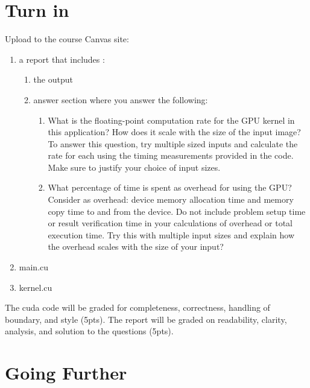 \documentclass{article}
\begin{document}
\section{Turn in}
Upload to the course Canvas site:
\begin{enumerate}
\item a report that includes :
	\begin{enumerate}
	\item the output 
	\item answer section where you answer the following:
		\begin{enumerate}
		\item What is the floating-point computation rate for the GPU kernel in this application? How does it scale with the size of the input image? To answer this question, try multiple sized inputs and calculate the rate for each using the timing measurements provided in the code. Make sure to justify your choice of input sizes.
		\item	What percentage of time is spent as overhead for using the GPU? Consider as overhead: device memory allocation time and memory copy time to and from the device. Do not include problem setup time or result verification time in your calculations of overhead or total execution time. Try this with multiple input sizes and explain how the overhead scales with the size of your input?

		\end{enumerate}
	\end{enumerate}
\item main.cu
\item kernel.cu
\end{enumerate} 
The cuda code will be graded for completeness, correctness, handling of boundary, and style (5pts).  The report will be graded on readability, clarity, analysis, and solution to the questions (5pts).


\section{Going Further}
\end{document}
